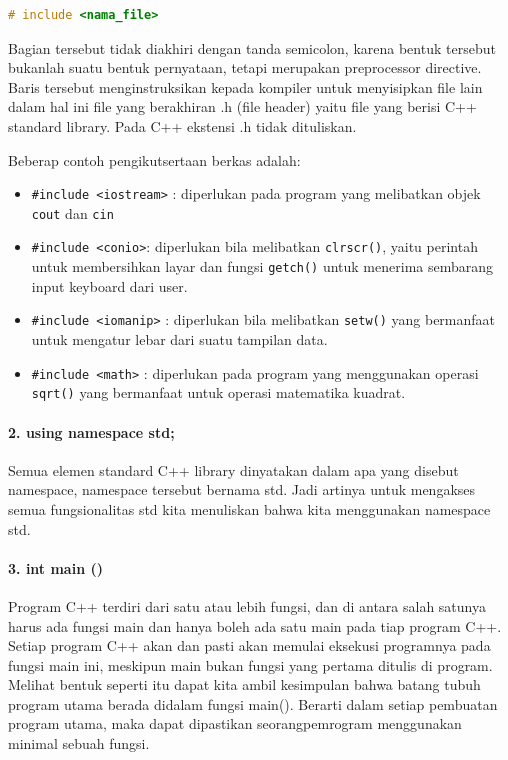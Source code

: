 \begin{lstlisting}[language=c++, numbers=none]
# include <nama_file>
\end{lstlisting}

Bagian tersebut tidak diakhiri dengan tanda semicolon, karena bentuk
tersebut bukanlah suatu bentuk pernyataan, tetapi merupakan preprocessor
directive. Baris tersebut menginstruksikan kepada kompiler untuk
menyisipkan file lain dalam hal ini file yang berakhiran .h (file
header) yaitu file yang berisi C++ standard library. Pada C++ ekstensi
.h tidak dituliskan.

Beberap contoh pengikutsertaan berkas adalah:

\begin{itemize}
\tightlist
\item
  \texttt{\#include\ \textless{}iostream\textgreater{}} : diperlukan
  pada program yang melibatkan objek \texttt{cout} dan \texttt{cin}
\item
  \texttt{\#include\ \textless{}conio\textgreater{}}: diperlukan bila
  melibatkan \texttt{clrscr()}, yaitu perintah untuk membersihkan layar
  dan fungsi \texttt{getch()} untuk menerima sembarang input keyboard
  dari user.
\item
  \texttt{\#include\ \textless{}iomanip\textgreater{}} : diperlukan bila
  melibatkan \texttt{setw()} yang bermanfaat untuk mengatur lebar dari
  suatu tampilan data.
\item
  \texttt{\#include\ \textless{}math\textgreater{}} : diperlukan pada
  program yang menggunakan operasi \texttt{sqrt()} yang bermanfaat untuk
  operasi matematika kuadrat.
\end{itemize}

\paragraph{2. using namespace std;}\label{using-namespace-std}

Semua elemen standard C++ library dinyatakan dalam apa yang disebut
namespace, namespace tersebut bernama std. Jadi artinya untuk mengakses
semua fungsionalitas std kita menuliskan bahwa kita menggunakan
namespace std.

\paragraph{3. int main ()}\label{int-main}

Program C++ terdiri dari satu atau lebih fungsi, dan di antara salah
satunya harus ada fungsi main dan hanya boleh ada satu main pada tiap
program C++. Setiap program C++ akan dan pasti akan memulai eksekusi
programnya pada fungsi main ini, meskipun main bukan fungsi yang pertama
ditulis di program. Melihat bentuk seperti itu dapat kita ambil
kesimpulan bahwa batang tubuh program utama berada didalam fungsi
main(). Berarti dalam setiap pembuatan program utama, maka dapat
dipastikan seorangpemrogram menggunakan minimal sebuah fungsi.

